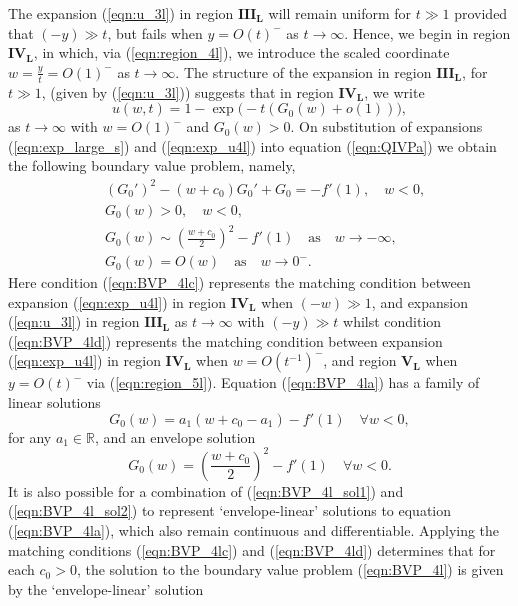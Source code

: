 \documentclass[11pt,a4paper]{article}
\newcommand{\eeref}[1]{(\ref{eqn:#1})}
\newcommand{\eelab}[1]{\label{eqn:#1}}
\def\beq{\begin{equation}}
\def\eeq{\end{equation}}
\begin{document}
The expansion \eeref{u_3l} in region $\mathbf{III_L}$ will remain uniform for $t \gg 1$ provided that $(-y)\gg t$, but fails when $y=O(t)^-$ as $t \to \infty$. Hence, we begin in region $\mathbf{IV_L}$, in which, via \eeref{region_4l}, we introduce the scaled coordinate $w=\frac{y}{t}=O(1)^-$ as $t \to \infty$.
%
The structure of the expansion in region $\mathbf{III_L}$, for $t \gg 1$, (given by \eeref{u_3l}) suggests that in region $\mathbf{IV_L}$,  we write
\beq \eelab{exp_u4l}
u(w,t) = 1 - \exp \Big( -t \left( G_0(w) + o(1) \right) \Big),
\eeq
as $t \to \infty$ with $w=O(1)^-$ and $G_0(w) > 0$. On substitution of expansions  \eeref{exp_large_s} and \eeref{exp_u4l} into equation \eeref{QIVPa} we obtain the following boundary value problem, namely,
\begin{subequations} \eelab{BVP_4l}
 \begin{align}
& \left( G_0' \right)^2 - (w + c_0) G_0' + G_0  = -  f'(1) ,  \quad w < 0 , \eelab{BVP_4la}   \\
& G_0(w) > 0, \quad  w < 0 , \eelab{BVP_4lb} \\ 
& G_0(w) \sim \left(  \frac{w + c_0}{2} \right)^2 - f'(1) \quad \mbox{as} \quad w \to - \infty, \eelab{BVP_4lc} \\
& G_0(w) = O(w) \quad \mbox{as} \quad w \to 0^-. \eelab{BVP_4ld}
\end{align} 
\end{subequations}
Here condition \eeref{BVP_4lc} represents the matching condition between expansion \eeref{exp_u4l} in region $\mathbf{IV_L}$ when $(- w ) \gg 1$, and expansion \eeref{u_3l} in region $\mathbf{III_L}$ as $t \to \infty$ 
with $(-y)\gg t$
whilst condition \eeref{BVP_4ld} represents the matching condition between expansion \eeref{exp_u4l} in region $\mathbf{IV_L}$ when $w=O(t^{-1})^-$, and region $\mathbf{V_L}$ when $y=O(t)^-$ via \eeref{region_5l}. Equation \eeref{BVP_4la} has a family of linear solutions 
\beq \eelab{BVP_4l_sol1}
G_0(w)=a_1 ( w + c_0 -a_1) - f'(1) \quad \forall w < 0 ,
\eeq
for any $a_1 \in \mathbb{R}$, and an envelope solution 
\beq \eelab{BVP_4l_sol2}
G_0(w)= \left( \frac{w+c_0}{2} \right)^2 - f'(1) \quad \forall w < 0 .
\eeq
It is also possible for a combination of \eeref{BVP_4l_sol1} and \eeref{BVP_4l_sol2} to represent `envelope-linear' solutions to equation \eeref{BVP_4la}, which also remain continuous and differentiable. Applying the matching conditions \eeref{BVP_4lc} and \eeref{BVP_4ld} determines that for each $c_0 >0$, the solution to the boundary value problem \eeref{BVP_4l} is given by the `envelope-linear' solution
\end{document}
